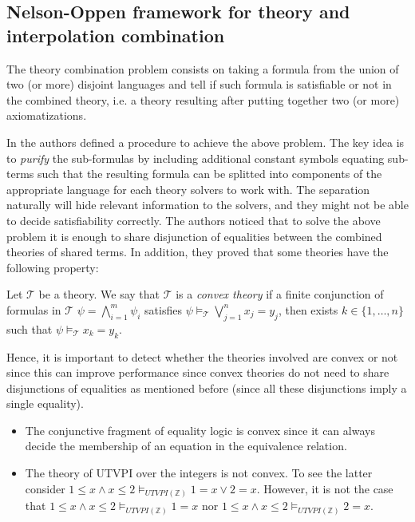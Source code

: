 \subsection{Nelson-Oppen framework for theory and interpolation
combination}

The theory combination problem consists on taking a 
formula from the union of two (or more) disjoint 
languages and tell if such formula is satisfiable
or not in the combined theory, i.e. a theory resulting
after putting together two (or more) axiomatizations.

In \cite{10.1145/357073.357079} the authors defined a procedure
to achieve the above problem. The key idea is to \emph{purify} 
the sub-formulas by including additional constant 
symbols equating sub-terms such that the resulting formula 
can be splitted into components of the appropriate language 
for each theory solvers to work with. The separation naturally
will hide relevant information to the solvers, and they 
might not be able to decide satisfiability correctly.
The authors noticed that to solve the above problem it is enough to 
share disjunction of equalities between the combined theories of shared
terms. In addition, they proved that some theories have the 
following property:

\begin{definition}
  Let $\mathcal{T}$ be a theory. We say that $\mathcal{T}$
  is a \emph{convex theory} if a finite conjunction of formulas 
  in $\mathcal{T}$ $\psi = \bigwedge_{i = 1}^m \psi_i$ satisfies
  $\psi \models_{\mathcal{T}} \bigvee_{j = 1}^n 
  x_j = y_j$, then exists $k \in \{1, \dots, n \}$ such that 
  $\psi \models_{\mathcal{T}} x_k = y_k$.
\end{definition}

Hence, it is important to detect
whether the theories involved are convex or not since 
this can improve performance since convex theories do not
need to share disjunctions of equalities as mentioned before
(since all these disjunctions imply a single equality).

\begin{example}
  \begin{itemize}
    \item The conjunctive fragment of equality logic is convex since
      it can always decide the membership of an equation in the 
      equivalence relation. 
    \item The theory of UTVPI over the integers is not 
      convex. To see the latter consider
      $1 \leq x \land x \leq 2 \models_{UTVPI(\mathbb{Z})} 1 = x \lor 2 = x$.
      However, it is not the case that 
      $1 \leq x \land x \leq 2 \models_{UTVPI(\mathbb{Z})} 1 = x$
      nor 
      $1 \leq x \land x \leq 2 \models_{UTVPI(\mathbb{Z})} 2 = x$.
  \end{itemize}
\end{example}

